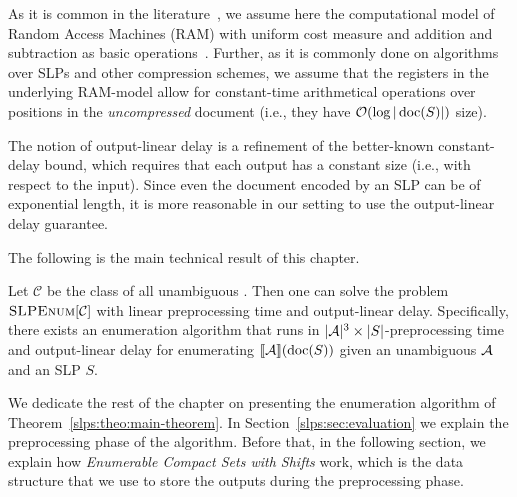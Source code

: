 As it is common in the literature~\cite{Segoufin13}, we assume here the computational model of Random Access Machines (RAM) with uniform cost measure and addition and subtraction as basic operations~\cite{aho1974design}. 
Further, as it is commonly done on algorithms over SLPs and other compression schemes, we assume that the registers in the underlying RAM-model allow for constant-time arithmetical operations over positions in the {\it uncompressed} document (i.e., they have $\mathcal{O}(\log |\operatorname{doc}(S)|)$ size).

The notion of output-linear delay is a refinement of the better-known constant-delay bound, which requires that each output has a constant size (i.e., with respect to the input). Since even the document encoded by an SLP can be of exponential length, it is more reasonable in our setting to use the output-linear delay guarantee. 


The following is the main technical result of this chapter.

\begin{theorem}\label{slps:theo:main-theorem}
	Let $\mathcal{C}$ be the class of all unambiguous \rts. Then one can solve the problem $\textsc{SLPEnum}[\mathcal{C}]$ with linear preprocessing time and output-linear delay. Specifically, there exists an enumeration algorithm that runs in $|\mathcal{A}|^3 \times |S|$-preprocessing time and output-linear delay for enumerating $\llbracket \mathcal{A} \rrbracket(\operatorname{doc}(S))$ given an unambiguous \rt $\mathcal{A}$ and an SLP $S$. 
\end{theorem}

We dedicate the rest of the chapter on presenting the enumeration algorithm of Theorem~\ref{slps:theo:main-theorem}. In Section~\ref{slps:sec:evaluation} we explain the preprocessing phase of the algorithm. Before that, in the following section, we explain how \emph{Enumerable Compact Sets with Shifts} work, which is the data structure that we use to store the outputs during the preprocessing phase. 


%
%




